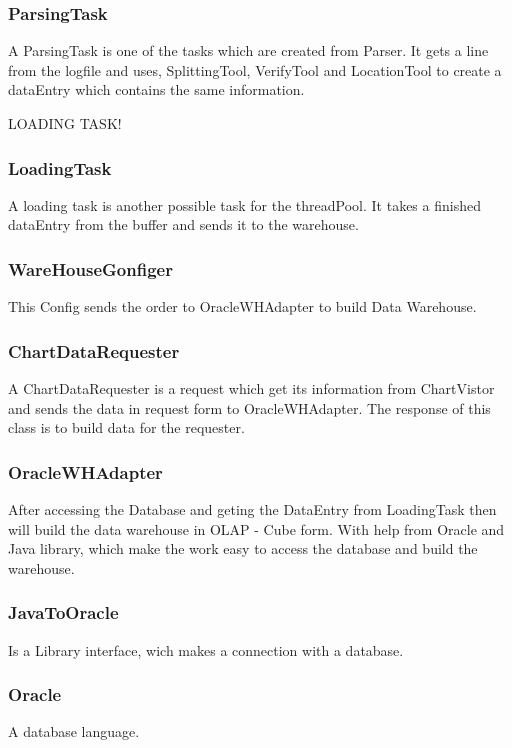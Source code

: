 \subsubsection*{ParsingTask}
A ParsingTask is one of the tasks which are created from Parser. It gets a line from the logfile and uses, SplittingTool, VerifyTool
and LocationTool to create a dataEntry which contains the same information. 

LOADING TASK!

\subsubsection*{LoadingTask}
A loading task is another possible task for the threadPool. It takes a finished dataEntry from the buffer and sends it to the warehouse.

\subsubsection*{WareHouseGonfiger}

This Config sends the order to OracleWHAdapter to build Data Warehouse.

\subsubsection*{ChartDataRequester}

A ChartDataRequester is a request which get its information from ChartVistor
and sends the data in request form to OracleWHAdapter. %
The response of this class is to build data for the requester.

\subsubsection*{OracleWHAdapter}

After accessing the Database and geting the DataEntry from LoadingTask then will build %
the data warehouse in OLAP - Cube form. With help from Oracle %
and Java library, which make the work easy to access the database and build the warehouse.

\subsubsection*{JavaToOracle}

Is a Library interface, wich makes a connection with a database.

\subsubsection*{Oracle}

A database language. %

